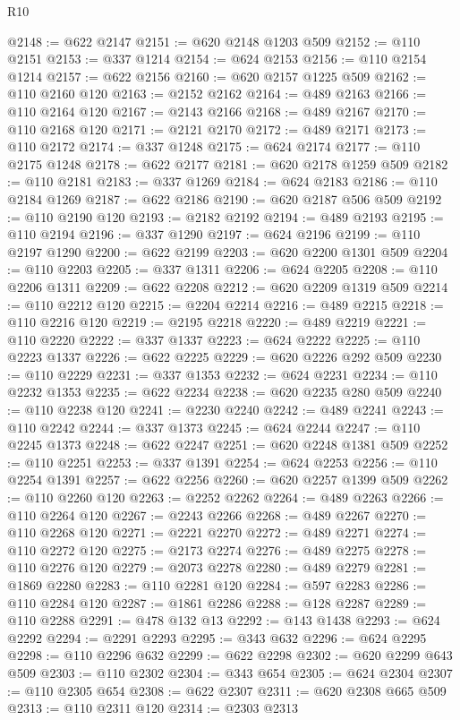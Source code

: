 \begin{lexlean}{R10}
\begin{coremodule}
@2148 := @622 @2147
@2151 := @620 @2148 @1203 @509
@2152 := @110 @2151
@2153 := @337 @1214
@2154 := @624 @2153
@2156 := @110 @2154 @1214
@2157 := @622 @2156
@2160 := @620 @2157 @1225 @509
@2162 := @110 @2160 @120
@2163 := @2152 @2162
@2164 := @489 @2163
@2166 := @110 @2164 @120
@2167 := @2143 @2166
@2168 := @489 @2167
@2170 := @110 @2168 @120
@2171 := @2121 @2170
@2172 := @489 @2171
@2173 := @110 @2172
@2174 := @337 @1248
@2175 := @624 @2174
@2177 := @110 @2175 @1248
@2178 := @622 @2177
@2181 := @620 @2178 @1259 @509
@2182 := @110 @2181
@2183 := @337 @1269
@2184 := @624 @2183
@2186 := @110 @2184 @1269
@2187 := @622 @2186
@2190 := @620 @2187 @506 @509
@2192 := @110 @2190 @120
@2193 := @2182 @2192
@2194 := @489 @2193
@2195 := @110 @2194
@2196 := @337 @1290
@2197 := @624 @2196
@2199 := @110 @2197 @1290
@2200 := @622 @2199
@2203 := @620 @2200 @1301 @509
@2204 := @110 @2203
@2205 := @337 @1311
@2206 := @624 @2205
@2208 := @110 @2206 @1311
@2209 := @622 @2208
@2212 := @620 @2209 @1319 @509
@2214 := @110 @2212 @120
@2215 := @2204 @2214
@2216 := @489 @2215
@2218 := @110 @2216 @120
@2219 := @2195 @2218
@2220 := @489 @2219
@2221 := @110 @2220
@2222 := @337 @1337
@2223 := @624 @2222
@2225 := @110 @2223 @1337
@2226 := @622 @2225
@2229 := @620 @2226 @292 @509
@2230 := @110 @2229
@2231 := @337 @1353
@2232 := @624 @2231
@2234 := @110 @2232 @1353
@2235 := @622 @2234
@2238 := @620 @2235 @280 @509
@2240 := @110 @2238 @120
@2241 := @2230 @2240
@2242 := @489 @2241
@2243 := @110 @2242
@2244 := @337 @1373
@2245 := @624 @2244
@2247 := @110 @2245 @1373
@2248 := @622 @2247
@2251 := @620 @2248 @1381 @509
@2252 := @110 @2251
@2253 := @337 @1391
@2254 := @624 @2253
@2256 := @110 @2254 @1391
@2257 := @622 @2256
@2260 := @620 @2257 @1399 @509
@2262 := @110 @2260 @120
@2263 := @2252 @2262
@2264 := @489 @2263
@2266 := @110 @2264 @120
@2267 := @2243 @2266
@2268 := @489 @2267
@2270 := @110 @2268 @120
@2271 := @2221 @2270
@2272 := @489 @2271
@2274 := @110 @2272 @120
@2275 := @2173 @2274
@2276 := @489 @2275
@2278 := @110 @2276 @120
@2279 := @2073 @2278
@2280 := @489 @2279
@2281 := @1869 @2280
@2283 := @110 @2281 @120
@2284 := @597 @2283
@2286 := @110 @2284 @120
@2287 := @1861 @2286
@2288 := @128 @2287
@2289 := @110 @2288
@2291 := @478 @132 @13
@2292 := @143 @1438
@2293 := @624 @2292
@2294 := @2291 @2293
@2295 := @343 @632
@2296 := @624 @2295
@2298 := @110 @2296 @632
@2299 := @622 @2298
@2302 := @620 @2299 @643 @509
@2303 := @110 @2302
@2304 := @343 @654
@2305 := @624 @2304
@2307 := @110 @2305 @654
@2308 := @622 @2307
@2311 := @620 @2308 @665 @509
@2313 := @110 @2311 @120
@2314 := @2303 @2313

\end{coremodule}
\end{lexlean}
